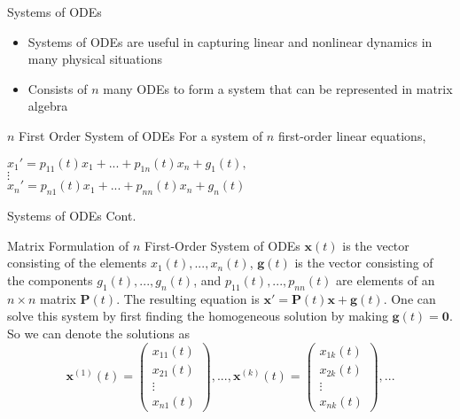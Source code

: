 \documentclass[aspectratio=169,xcolor=dvipsnames]{beamer}
\begin{document}
\begin{frame}{Systems of ODEs}
\begin{itemize}
    \item Systems of ODEs are useful in capturing linear and nonlinear dynamics in many physical situations
    \item Consists of $n$ many ODEs to form a system that can be represented in matrix algebra
\end{itemize}
\begin{block}{$n$ First Order System of ODEs}
For a system of $n$ first-order linear equations,

\begin{center}
    $x_{1}' = p_{11}(t)x_{1} + ... + p_{1n}(t)x_{n} + g_{1}(t),$\\
    $\vdots$\\
    $x_{n}' = p_{n1}(t)x_{1} + ... + p_{nn}(t)x_{n} + g_{n}(t)$
\end{center}
\end{block}

\end{frame}

\begin{frame}{Systems of ODEs Cont.}
\begin{block}{Matrix Formulation of $n$ First-Order System of ODEs}
    $\boldsymbol{x}(t)$ is the vector consisting of the elements $x_{1}(t),..., x_{n}(t)$, $\boldsymbol{g}(t)$ is the vector consisting of the components $g_{1}(t),...,g_{n}(t)$, and $p_{11}(t),..., p_{nn}(t)$ are elements of an $n \times n$ matrix $\boldsymbol{P}(t)$. The resulting equation is $\boldsymbol{x}' = \boldsymbol{P}(t)\boldsymbol{x}+\boldsymbol{g}(t)$. One can solve this system by first finding the homogeneous solution by making $\boldsymbol{g}(t)=\boldsymbol{0}$. So we can denote the solutions as
\begin{equation}
    \boldsymbol{x}^{(1)}(t) = \begin{pmatrix}
        x_{11}(t)\\
        x_{21}(t)\\
        \vdots\\
        x_{n1}(t)
    \end{pmatrix}, ...,
    \boldsymbol{x}^{(k)}
(t) = \begin{pmatrix}
    x_{1k}(t)\\
    x_{2k}(t)\\
    \vdots\\
    x_{nk}(t)
\end{pmatrix},...
\label{eqn:ode_system}
\end{equation}
\end{block}
\end{frame}
\end{document}
